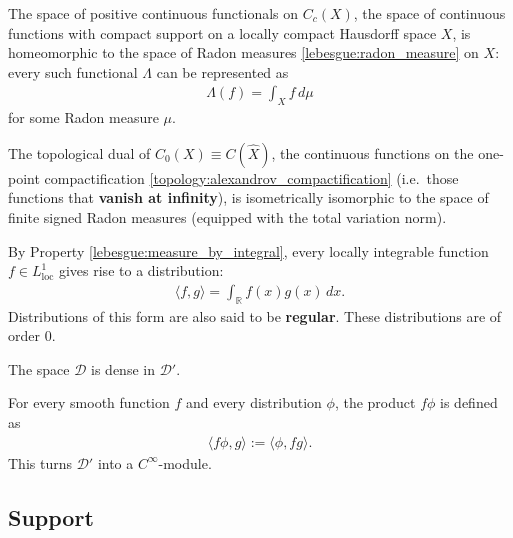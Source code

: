     \begin{theorem}\label{distributions:riesz_markov}
        The space of positive continuous functionals on $C_c(X)$, the space of continuous functions with compact support on a locally compact Hausdorff space $X$, is homeomorphic to the space of Radon measures \ref{lebesgue:radon_measure} on $X$: every such functional $\Lambda$ can be represented as
        \begin{gather}
            \Lambda(f) = \int_Xf\,d\mu
        \end{gather}
        for some Radon measure $\mu$.

        The topological dual of $C_0(X)\equiv C(\widehat{X})$, the continuous functions on the one-point compactification \ref{topology:alexandrov_compactification} (i.e.~those functions that \textbf{vanish at infinity}), is isometrically isomorphic to the space of finite signed Radon measures (equipped with the total variation norm).
    \end{theorem}

    \begin{example}\label{distributions:ordinary_function}
       	By Property \ref{lebesgue:measure_by_integral}, every locally integrable function $f\in L^1_\mathrm{loc}$ gives rise to a distribution:
       	\begin{gather}
   	    	\langle f,g \rangle = \int_\mathbb{R}f(x)g(x)\,dx.
       	\end{gather}
       Distributions of this form are also said to be \textbf{regular}. These distributions are of order 0.
   	\end{example}

    \begin{property}
        The space $\mathcal{D}$ is dense in $\mathcal{D}'$.
    \end{property}
    \begin{property}
        For every smooth function $f$ and every distribution $\phi$, the product $f\phi$ is defined as
        \begin{gather}
            \langle f\phi,g \rangle := \langle\phi,fg\rangle.
        \end{gather}
        This turns $\mathcal{D}'$ into a $C^\infty$-module.
    \end{property}

\subsection{Support}

